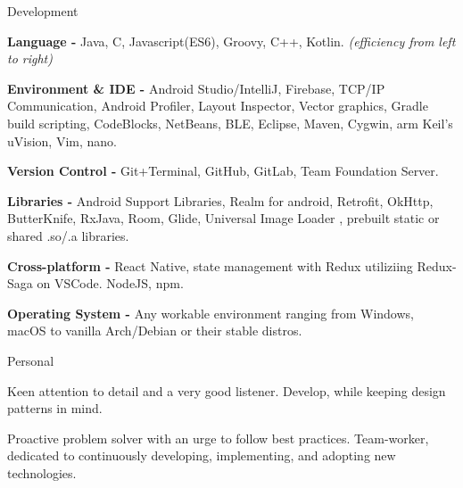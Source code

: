 

\begin{skillsentries}
  
  \skillsentry
    {Development} %
    {
      \begin{skillsitems} %
        \item {\textbf{Language -} Java, C, Javascript(ES6), Groovy, C++, Kotlin. \textsl{(efficiency from left to right)}}
        \item {\textbf{Environment \& IDE -} Android Studio/IntelliJ, Firebase, TCP/IP Communication, Android Profiler, Layout Inspector, 
        Vector graphics, Gradle build scripting, CodeBlocks, NetBeans, BLE, Eclipse, Maven, Cygwin, arm Keil's uVision, Vim, nano.}
        \item {\textbf{Version Control -} Git+Terminal, GitHub, GitLab, Team Foundation Server.}
        \item {\textbf{Libraries -} Android Support Libraries, Realm for android, Retrofit, OkHttp, ButterKnife, RxJava, Room, Glide, Universal Image Loader
        , prebuilt static or shared .so/.a libraries.}
        \item {\textbf{Cross-platform -} React Native, state management with Redux utiliziing Redux-Saga on VSCode. NodeJS, npm.}
        \item {\textbf{Operating System - } Any workable environment ranging from Windows, macOS to vanilla Arch/Debian or their stable distros.}
      \end{skillsitems}
    }

    
    \skillsentry
    {Personal} %
    {
      \begin{skillsitems} %
        \item {Keen attention to detail and a very good listener. Develop, while keeping design patterns in mind.}
        \item {Proactive problem solver with an urge to follow best practices. Team-worker, 
        dedicated to continuously developing, implementing, and adopting new technologies.}
      \end{skillsitems}
      }
      

\end{skillsentries}
